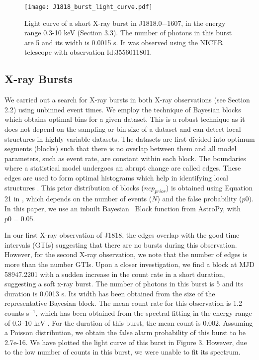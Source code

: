 \documentclass[twocolumn]{emulateapj}
\begin{document}

\begin{figure*}[b]
	\centering
	\texttt{[image: J1818\_burst\_light\_curve.pdf]}
	\caption{Light curve of a short X-ray burst in J1818.0$-$1607, in the energy range 0.3-10 keV (Section 3.3). The number of photons in this burst are 5 and its width is 0.0015 s. It was observed using the NICER telescope with observation Id:3556011801.} 
	\label{Figure:Figure3}
\end{figure*}

\subsection{X-ray Bursts}

We carried out a search for X-ray bursts in both X-ray observations (see Section 2.2) using unbinned event times. We employ the technique of Bayesian blocks \citep{scargle12} which obtains optimal bins for a given dataset. This is a robust technique as it does not depend on the sampling or bin size of a dataset and can detect local structures in highly variable datasets. The datasets are first divided into optimum segments (blocks) such that there is no overlap between them and all model parameters, such as event rate, are constant within each block. The boundaries where a statistical model undergoes an abrupt change are called edges. These edges are used to form optimal histograms which help in identifying local structures \citep{lin13}. This prior distribution of blocks ($ncp_{prior}$) is obtained using Equation 21 in \cite{scargle12}, which depends on the number of events ($N$) and the false probability ($p0$). In this paper, we use an inbuilt Bayesian  Block function from AstroPy, with $p0 = 0.05$.


In our first X-ray observation of J1818, the edges overlap with the good time intervals (GTIs) suggesting that there are no bursts during this observation. However, for the second X-ray observation, we note that the number of edges is more than the number GTIs. Upon a closer investigation, we find a block at MJD 58947.2201 with a sudden increase in the count rate in a short duration, suggesting a soft x-ray burst. The number of photons in this burst is 5 and its duration is 0.0013 s. Its width has been obtained from the size of the representative Bayesian block. The mean count rate for this observation is 1.2 counts s$^{-1}$, which has been obtained from the spectral fitting in the energy range of 0.3--10 keV \citep{hu2020}. For the duration of this burst, the mean count is 0.002. Assuming a Poisson distribution, we obtain the false alarm probability of this burst to be 2.7e-16. We have plotted the light curve of this burst in Figure 3. However, due to the low number of counts in this burst, we were unable to fit its spectrum.
\end{document}
